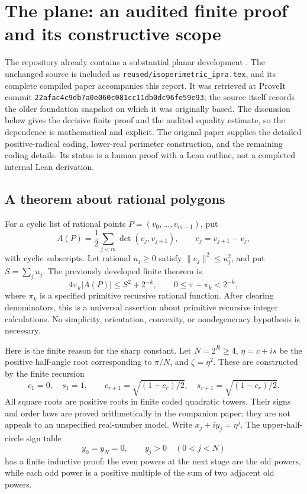 \section{The plane: an audited finite proof and its constructive scope}
\label{sec:plane-new}

The repository already contains a substantial planar development
\cite{prior-planar}.  The
unchanged source is included as \texttt{reused/isoperimetric\_ipra.tex},
and its complete compiled paper accompanies this report.  It was retrieved
at ProveIt commit
\texttt{22afac4c9db7a0e060c081cc11db0dc96fe59e93}; the source itself
records the older foundation snapshot on which it was originally based.
The discussion below gives the decisive finite proof and the audited
equality estimate, so the dependence is mathematical and explicit.
The original paper supplies the detailed positive-radical coding,
lower-real perimeter construction, and the remaining coding details.
Its status is a human proof with a Lean outline, not a completed
internal Lean derivation.

\subsection{A theorem about rational polygons}
For a cyclic list of rational points \(P=(v_0,\ldots,v_{m-1})\), put
\[
 A(P)=\frac12\sum_{j<m}\det(v_j,v_{j+1}),\qquad
 e_j=v_{j+1}-v_j,
\]
with cyclic subscripts.  Let rational \(u_j\ge0\) satisfy
\(\lVert e_j\rVert^2\le u_j^2\), and put \(S=\sum_j u_j\).
The previously developed finite theorem is
\begin{equation}\label{eq:plane-finite}
 4\pi_k |A(P)|\le S^2+2^{-k},
 \qquad 0\le\pi-\pi_k<2^{-k},
\end{equation}
where \(\pi_k\) is a specified primitive recursive rational function.
After clearing denominators, this is a universal assertion about
primitive recursive integer calculations.  No simplicity, orientation,
convexity, or nondegeneracy hypothesis is necessary.

Here is the finite reason for the sharp constant.  Let \(N=2^R\ge4\),
\(\eta=c+is\) be the positive half-angle root corresponding to
\(\pi/N\), and \(\zeta=\eta^2\).  These are constructed by the finite
recursion
\[
 c_1=0,\quad s_1=1,\qquad
 c_{r+1}=\sqrt{(1+c_r)/2},\quad
 s_{r+1}=\sqrt{(1-c_r)/2}.
\]
All square roots are positive roots in finite coded quadratic towers.
Their signs and order laws are proved arithmetically in the companion
paper; they are not appeals to an unspecified real-number model.
Write \(x_j+iy_j=\eta^j\).  The upper-half-circle sign table
\[
 y_0=y_N=0,\qquad y_j>0\quad(0<j<N)
\]
has a finite inductive proof: the even powers at the next stage are
the old powers, while each odd power is a positive multiple of the
sum of two adjacent old powers.

